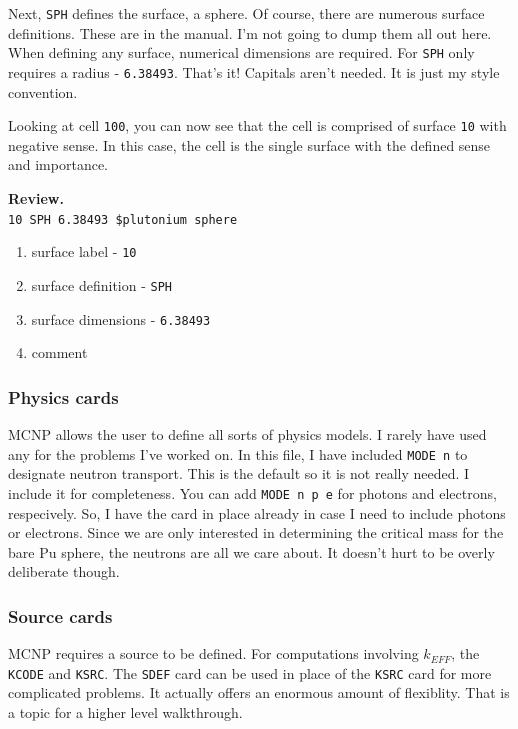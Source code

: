 \documentclass[11pt,a4paper]{article}
\begin{document}
\noindent Next, \texttt{SPH} defines the surface, a sphere. Of course, there are numerous surface definitions. These are in the manual. I'm not going to dump them all out here. \\

\noindent When defining any surface, numerical dimensions are required. For \texttt{SPH} only requires a radius - \texttt{6.38493}. That's it! Capitals aren't needed. It is just my style convention. 

\noindent Looking at cell \texttt{100}, you can now see that the cell is comprised of surface \texttt{10} with negative sense. In this case, the cell is the single surface with the defined sense and importance.

\noindent\textbf{Review.}\\
\noindent\texttt{10     SPH  6.38493     \$plutonium sphere}\\

\begin{enumerate}[topsep=0pt,itemsep=-1ex,partopsep=1ex,parsep=1ex]
    \item surface label - \texttt{10}
    \item surface definition - \texttt{SPH}
    \item surface dimensions - \texttt{6.38493}
    \item comment
\end{enumerate}

\subsubsection{Physics cards}
\noindent MCNP allows the user to define all sorts of physics models. I rarely have used any for the problems I've worked on. In this file, I have included \texttt{MODE   n} to designate neutron transport. This is the default so it is not really needed. I include it for completeness. You can add \texttt{MODE   n p e} for photons and electrons, respecively. So, I have the card in place already in case I need to include photons or electrons. Since we are only interested in determining
the critical mass for the bare Pu sphere, the neutrons are all we care about. It doesn't hurt to be overly deliberate
though.

\subsubsection{Source cards}
\noindent MCNP requires a source to be defined. For computations involving $k_{EFF}$, the \texttt{KCODE} and \texttt{KSRC}. The \texttt{SDEF} card can be used in place of the \texttt{KSRC} card for more complicated problems. It actually offers an enormous amount of flexiblity. That is a topic for a higher level walkthrough. \\
\end{document}
